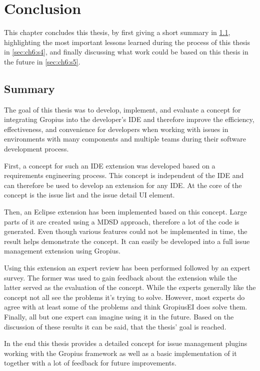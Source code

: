 
\chapter{Conclusion}
\label{chap:ch6}
This chapter concludes this thesis, by first giving a short summary in \cref{sec:ch6:s1}, highlighting the most important lessons learned during the process of this thesis in \cref{sec:ch6:s4}, and finally discussing what work could be based on this thesis in the future in \cref{sec:ch6:s5}.

\section{Summary}
\label{sec:ch6:s1}
The goal of this thesis was to develop, implement, and evaluate a concept for integrating \gls{Gropius} into the developer's \gls{IDE} and therefore improve the efficiency, effectiveness, and convenience for developers when working with issues in environments with many components and multiple teams during their software development process.

First, a concept for such an \gls{IDE} extension was developed based on a requirements engineering process.
This concept is independent of the \gls{IDE} and can therefore be used to develop an extension for any \gls{IDE}.
At the core of the concept is the issue list and the issue detail \gls{UI} element.

Then, an \gls{Eclipse} extension has been implemented based on this concept.
Large parts of it are created using a \gls{MDSD} approach, therefore a lot of the code is generated.
Even though various features could not be implemented in time, the result helps demonstrate the concept.
It can easily be developed into a full issue management extension using \gls{Gropius}.

Using this extension an expert review has been performed followed by an expert survey.
The former was used to gain feedback about the extension while the latter served as the evaluation of the concept.
While the experts generally like the concept not all see the problems it's trying to solve.
However, most experts do agree with at least some of the problems and think \gls{GropiusEI} does solve them.
Finally, all but one expert can imagine using it in the future.
Based on the discussion of these results it can be said, that the thesis' goal is reached.

In the end this thesis provides a detailed concept for issue management plugins working with the \gls{Gropius} framework as well as a basic implementation of it together with a lot of feedback for future improvements.

